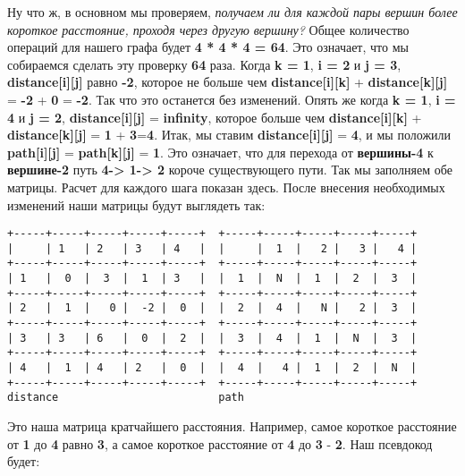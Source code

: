 \vspace{\baselineskip}
Ну что ж, в основном мы проверяем, \textit{получаем ли для каждой пары вершин более короткое расстояние, проходя через другую вершину?} Общее количество операций для нашего графа будет \textbf{4 * 4 * 4 = 64}. Это означает, что мы собираемся сделать эту проверку \textbf{64} раза. Когда \textbf{k = 1}, \textbf{i = 2} и \textbf{j = 3}, \textbf{distance[i][j]} равно \textbf{-2}, которое не больше чем \textbf{distance[i][k]} + \textbf{distance[k][j]} = \textbf{-2} + \textbf{0} = \textbf{-2}. Так что это останется без изменений.  Опять же когда \textbf{k = 1}, \textbf{i = 4} и \textbf{j = 2}, \textbf{distance[i][j]} = \textbf{infinity}, которое больше чем \textbf{distance[i][k]} + \textbf{distance[k][j]} = \textbf{1} + \textbf{3}=\textbf{4}. Итак, мы ставим \textbf{distance[i][j]} = \textbf{4}, и мы положили \textbf{path[i][j]} = \textbf{path[k][j]} = \textbf{1}. Это означает, что для перехода от \textbf{вершины-4} к \textbf{вершине-2} путь \textbf{4-> 1-> 2} короче существующего пути. Так мы заполняем обе матрицы. Расчет для каждого шага показан здесь. После внесения необходимых изменений наши матрицы будут выглядеть так:

\newpage

\begin{tcolorbox}
\begin{verbatim}
+-----+-----+-----+-----+-----+  +-----+-----+-----+-----+-----+
|     | 1   | 2   | 3   | 4   |  |     |  1  |   2 |   3 |   4 |
+-----+-----+-----+-----+-----+  +-----+-----+-----+-----+-----+
| 1   |  0  |  3  |  1  | 3   |  |  1  |  N  |  1  |  2  |  3  |
+-----+-----+-----+-----+-----+  +-----+-----+-----+-----+-----+
| 2   |  1  |   0 |  -2 |  0  |  |  2  |  4  |   N |   2 |  3  |
+-----+-----+-----+-----+-----+  +-----+-----+-----+-----+-----+
| 3   | 3   | 6   |  0  |  2  |  |  3  |  4  |  1  |  N  |  3  |
+-----+-----+-----+-----+-----+  +-----+-----+-----+-----+-----+
| 4   |  1  | 4   | 2   |  0  |  |  4  |   4 |  1  |  2  |  N  |
+-----+-----+-----+-----+-----+  +-----+-----+-----+-----+-----+
distance                         path
\end{verbatim}
\end{tcolorbox}

\vspace{\baselineskip}
Это наша матрица кратчайшего расстояния. Например, самое короткое расстояние от \textbf{1} до \textbf{4} равно \textbf{3}, а самое короткое расстояние от \textbf{4} до \textbf{3} - \textbf{2}. Наш псевдокод будет:

